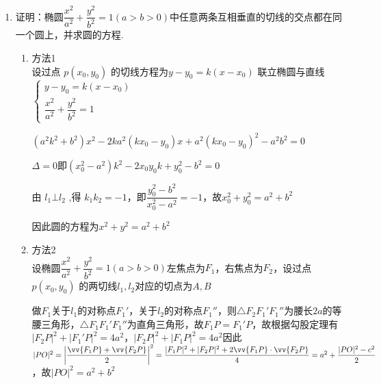 \begin{enumerate}
\begin{enumerate}
\begin{jieda}
            蒙日圆方程为 ${x}^{2} + {y}^{2} = {b}^{2} + 9$ , 因此,需满足圆心到直线 ${4x} - {3y} + {20} = 0$ 的距离不大于半径，即 $\dfrac{20}{5} \leq  \sqrt{{b}^{2} + 9}$ ,所以 ${b}^{2} \geq  7$ ,所以椭圆离心率 ${e}^{2} = 1 - \dfrac{{b}^{2}}{9} \leq  \dfrac{2}{9}$ ,所以 $0 < e \leq  \dfrac{\sqrt{2}}{3}$ .
        \end{jieda}

        \item 证明：椭圆$\dfrac{x^2}{a^2}+\dfrac{y^2}{b^2} = 1 (a>b>0)$中任意两条互相垂直的切线的交点都在同一个圆上，并求圆的方程.
        \begin{jieda}
            \begin{enumerate}
                \item 方法1 \\
                设过点 $p\left( {{x}_{0},{y}_{0}}\right)$ 的切线方程为$y - {y}_{0} = k\left( {x - {x}_{0}}\right)$ 联立椭圆与直线$\left\{  \begin{matrix} y - {y}_{0} = k\left( {x - {x}_{0}}\right) \\  \dfrac{{x}^{2}}{{a}^{2}} + \dfrac{{y}^{2}}{{b}^{2}} = 1 \end{matrix}\right.$
                
                $\left( {{a}^{2}{k}^{2} + {b}^{2}}\right) {x}^{2} - {2k}{a}^{2}\left( {k{x}_{0} - {y}_{0}}\right) x + {a}^{2}\left( k{x}_{0} - {y}_{0}\right)^{2} - {a}^{2}{b}^{2} = 0$
        
                $\Delta  = 0$即$\left( {{x}_{0}^{2} - {a}^{2}}\right) {k}^{2} - 2{x}_{0}{y}_{0}k + {y}_{0}^{2} - {b}^{2} = 0$
                
                由 ${l}_{1} \bot  {l}_{2}$ ,得 ${k}_{1}{k}_{2} =  - 1$，即$\dfrac{{y}_{0}^{2} - {b}^{2}}{{x}_{0}^{2} - {a}^{2}} =  - 1$，故${x}_{0}^{2} + {y}_{0}^{2} = {a}^{2} + {b}^{2}$
        
                因此圆的方程为$x^2+y^2 = a^2+b^2$
                \item 方法2 \\
                设椭圆$\dfrac{x^2}{a^2}+\dfrac{y^2}{b^2} = 1 (a>b>0)$左焦点为$F_1$，右焦点为$F_2$，设过点 $p\left( {{x}_{0},{y}_{0}}\right)$ 的两切线$l_1, l_2$对应的切点为$A, B$

                做$F_1$关于$l_1$的对称点$F_1'$，关于$l_2$的对称点$F_1''$，则$\triangle F_2F_1'F_1''$为腰长$2a$的等腰三角形，$\triangle F_1F_1'F_1''$为直角三角形，故$F_1P = F_1'P$，故根据勾股定理有$|F_2P|^2 + |F_1'P|^2 = 4a^2$，$|F_2P|^2 + |F_1P|^2 = 4a^2$因此$|PO|^2 = \left|\dfrac{\vv{F_1P}+\vv{F_2P}}{2}\right|^2 = \dfrac{|F_1P|^2+|F_2P|^2 + 2\vv{F_1P} \cdot \vv{F_2P}}{4} = a^2 + \dfrac{|PO|^2 - c^2}{2}$，故$|PO|^2 = a^2+b^2$
                

\end{enumerate}
\end{jieda}
\end{enumerate}
\end{enumerate}
